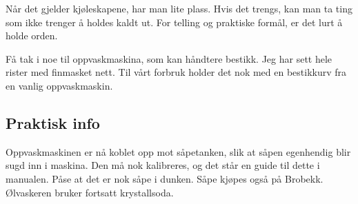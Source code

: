 Når det gjelder kjøleskapene, har man lite plass. Hvis det trengs, kan man ta
ting som ikke trenger å holdes kaldt ut. For telling og praktiske formål, er
det lurt å holde orden.

Få tak i noe til oppvaskmaskina, som kan håndtere bestikk. Jeg har sett hele 
rister med finmasket nett. Til vårt forbruk holder det nok med en bestikkurv
fra en vanlig oppvaskmaskin.

\subsection{Praktisk info}
Oppvaskmaskinen er nå koblet opp mot såpetanken, slik at såpen egenhendig
blir sugd inn i maskina. Den må nok kalibreres, og det står en guide til
dette i manualen. Påse at det er nok såpe i dunken. Såpe kjøpes også
på Brobekk. Ølvaskeren bruker fortsatt krystallsoda.
